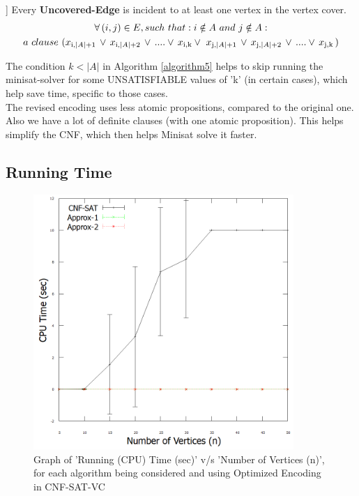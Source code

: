 \documentclass[11pt]{llncs}
\begin{document}
\begin{algorithm}[H]
{	
	] Every \textbf{Uncovered-Edge} is incident to at least one vertex in the vertex cover.
		\vspace{-2mm}
			\begin{gather*}
				\forall \, (i,j) \in E, such \,\, that: i \notin A \,\, and \,\,  j \notin A: \\
				a \,\, clause  \,\, (x\textsubscript{i,$|A|$+1} \, \lor \, x\textsubscript{i,$|A|$+2} \, \lor \, ....  \lor \, x\textsubscript{i,k} \lor \, \, x\textsubscript{j,$|A|$+1} \, \lor \, x\textsubscript{j,$|A|$+2} \, \lor \, ....  \lor \, x\textsubscript{j,k}\,)
			\end{gather*}


			}
		\end{algorithm}
	
	\vspace{4mm}

	The condition $k < |A|$ in Algorithm \ref{algorithm5} helps to skip running the minisat-solver for some UNSATISFIABLE values of 'k' (in certain cases), which help save time, specific to those cases.\\

	The revised encoding uses less atomic propositions, compared to the original one. Also we have a lot of definite clauses (with one atomic proposition). This helps simplify the CNF, which then helps Minisat solve it faster.

\newpage
     \subsection{Running Time}
	\vspace{-8mm}

	\begin{figure}[H]
		\includegraphics[width=0.88\textwidth]{optimized_time_vs_n.png}
		\caption{Graph of 'Running (CPU) Time (sec)' v/s 'Number of Vertices (n)', for each algorithm being considered and using Optimized Encoding in CNF-SAT-VC} \label{fig3}
	\end{figure}
	
\end{document}
